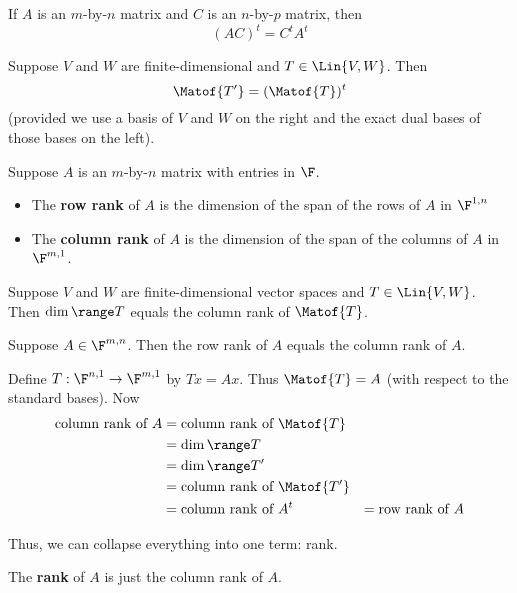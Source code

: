 \begin{theorem}
   If $A$ is an $m$-by-$n$ matrix and $C$ is an $n$-by-$p$ matrix, then
   \[ (AC)^t = C^t A^t \]
\end{theorem}

\begin{theorem}
   Suppose $V$ and $W$ are finite-dimensional and $T \in \Lin{V, W}$. Then
   \[ \Matof{T'} = (\Matof{T})^t \]
   (provided we use a basis of $V$ and $W$ on the right and the exact
   dual bases of those bases on the left).
\end{theorem}

\begin{definition} 
   Suppose $A$ is an $m$-by-$n$ matrix with entries in $\F$.
   \begin{itemize}
      \item The \textbf{row rank} of $A$ is the dimension of the span of the rows of $A$ in $\F^{1, n}$
      \item The \textbf{column rank} of $A$ is the dimension of the span of the columns of $A$ in $\F^{m, 1}$.
   \end{itemize}
\end{definition}

\begin{theorem} 
   Suppose $V$ and $W$ are finite-dimensional vector spaces and $T \in \Lin{V, W}$.
   Then $\dim \range T$ equals the column rank of $\Matof{T}$.
\end{theorem}

\begin{theorem}
   Suppose $A \in \F^{m, n}$. Then the row rank of $A$ equals the column rank
   of $A$.

   \begin{proof*}
      Define $T: \F^{n, 1} \to \F^{m, 1}$ by $Tx = Ax$. Thus $\Matof{T} = A$ (with
      respect to the standard bases). Now
      \begin{align*}
         \text{column rank of $A$} &= \text{column rank of $\Matof{T}$} \\
         &= \dim \range T \\
         &= \dim \range T' \\
         &= \text{column rank of $\Matof{T'}$} \\
         &= \text{column rank of $A^t$}
         &= \text{row rank of $A$}
      \end{align*}
   \end{proof*}
\end{theorem}

Thus, we can collapse everything into one term: rank.
\begin{definition} [Rank]
   The \textbf{rank} of $A$ is just the column rank of $A$.
\end{definition}
\endinput